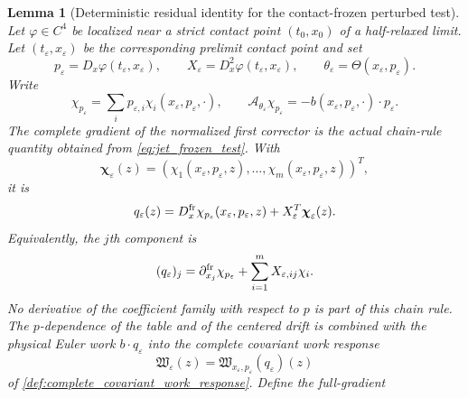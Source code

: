 \documentclass[12pt, letterpaper]{amsart}
\newcommand{\Acal}{\mathcal{A}}
\theoremstyle{plain}
\newtheorem{lemma}[theorem]{Lemma}
\theoremstyle{definition}
\theoremstyle{remark}
\begin{document}
\begin{lemma}[Deterministic residual identity for the contact-frozen perturbed test]
\label{lem:deterministic_residual_identity}
\label{def:full_gradient_second_cell}
Let $\varphi\in C^4$ be localized near a strict contact point
$(t_0,x_0)$ of a half-relaxed limit.  Let
$(t_\varepsilon,x_\varepsilon)$ be the corresponding prelimit contact point and
set
\begin{equation}
    p_\varepsilon=D_x\varphi(t_\varepsilon,x_\varepsilon),\qquad
    X_\varepsilon=D_x^2\varphi(t_\varepsilon,x_\varepsilon),\qquad
    \theta_\varepsilon=\Theta(x_\varepsilon,p_\varepsilon).
\end{equation}
Write
\begin{equation}
    \chi_{p_\varepsilon}
       =\sum_i p_{\varepsilon,i}\chi_i(x_\varepsilon,p_\varepsilon,\cdot),
    \qquad
    \Acal_{\theta_\varepsilon}\chi_{p_\varepsilon}
       =-b(x_\varepsilon,p_\varepsilon,\cdot)\cdot p_\varepsilon .
\end{equation}
The complete gradient of the normalized first corrector is the actual chain-rule
quantity obtained from \eqref{eq:jet_frozen_test}.  With
\begin{equation}
    \boldsymbol\chi_\varepsilon(z)
    =(\chi_1(x_\varepsilon,p_\varepsilon,z),\ldots,
      \chi_m(x_\varepsilon,p_\varepsilon,z))^T,
\end{equation}
it is
\begin{equation}
\label{eq:full_gradient_response_vector}
    q_\varepsilon(z)
    =D_x^{\rm fr}\chi_{p_\varepsilon}(x_\varepsilon,p_\varepsilon,z)
      +X_\varepsilon^T\boldsymbol\chi_\varepsilon(z) .
\end{equation}
Equivalently, the $j$th component is
\begin{equation}
\label{eq:full_gradient_response_vector_components}
    (q_\varepsilon)_j
    =\partial_{x_j}^{\rm fr}\chi_{p_\varepsilon}
      +\sum_{i=1}^m X_{\varepsilon,ij}\chi_i .
\end{equation}
No derivative of the coefficient family with respect to $p$ is part of this
chain rule.  The $p$-dependence of the table and of the centered drift is
combined with the physical Euler work $b\cdot q_\varepsilon$ into the complete
covariant work response
\begin{equation}
\label{eq:contact_response_observable_C}
    \mathfrak W_\varepsilon(z)
    =\mathfrak W_{x_\varepsilon,p_\varepsilon}(q_\varepsilon)(z)
\end{equation}
of \cref{def:complete_covariant_work_response}.  Define the full-gradient

\end{lemma}
\end{document}
